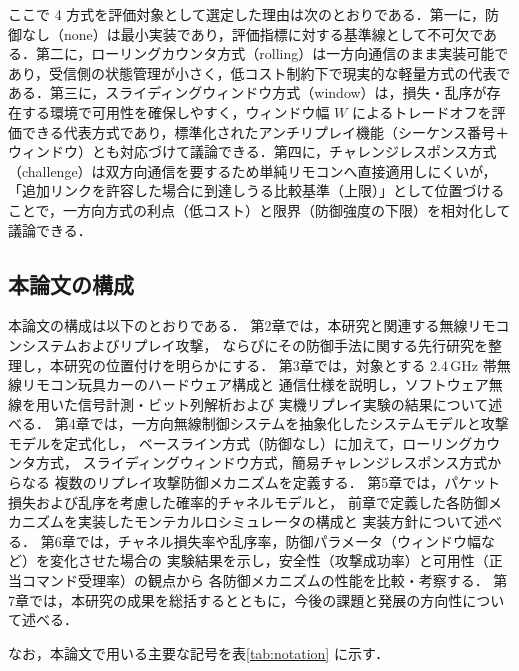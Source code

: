 \documentclass[twocolumn,10pt,a4paper]{jsarticle}
\begin{document}
ここで 4 方式を評価対象として選定した理由は次のとおりである．第一に，防御なし（none）は最小実装であり，評価指標に対する基準線として不可欠である．第二に，ローリングカウンタ方式（rolling）は一方向通信のまま実装可能であり，受信側の状態管理が小さく，低コスト制約下で現実的な軽量方式の代表である．第三に，スライディングウィンドウ方式（window）は，損失・乱序が存在する環境で可用性を確保しやすく，ウィンドウ幅 $W$ によるトレードオフを評価できる代表方式であり，標準化されたアンチリプレイ機能（シーケンス番号＋ウィンドウ）とも対応づけて議論できる．第四に，チャレンジレスポンス方式（challenge）は双方向通信を要するため単純リモコンへ直接適用しにくいが，「追加リンクを許容した場合に到達しうる比較基準（上限）」として位置づけることで，一方向方式の利点（低コスト）と限界（防御強度の下限）を相対化して議論できる．

\subsection{本論文の構成}

本論文の構成は以下のとおりである．
第2章では，本研究と関連する無線リモコンシステムおよびリプレイ攻撃，
ならびにその防御手法に関する先行研究を整理し，本研究の位置付けを明らかにする．
第3章では，対象とする 2.4\,GHz 帯無線リモコン玩具カーのハードウェア構成と
通信仕様を説明し，ソフトウェア無線を用いた信号計測・ビット列解析および
実機リプレイ実験の結果について述べる．
第4章では，一方向無線制御システムを抽象化したシステムモデルと攻撃モデルを定式化し，
ベースライン方式（防御なし）に加えて，ローリングカウンタ方式，
スライディングウィンドウ方式，簡易チャレンジレスポンス方式からなる
複数のリプレイ攻撃防御メカニズムを定義する．
第5章では，パケット損失および乱序を考慮した確率的チャネルモデルと，
前章で定義した各防御メカニズムを実装したモンテカルロシミュレータの構成と
実装方針について述べる．
第6章では，チャネル損失率や乱序率，防御パラメータ（ウィンドウ幅など）を変化させた場合の
実験結果を示し，安全性（攻撃成功率）と可用性（正当コマンド受理率）の観点から
各防御メカニズムの性能を比較・考察する．
第7章では，本研究の成果を総括するとともに，今後の課題と発展の方向性について述べる．

なお，本論文で用いる主要な記号を表\ref{tab:notation} に示す．
\end{document}
